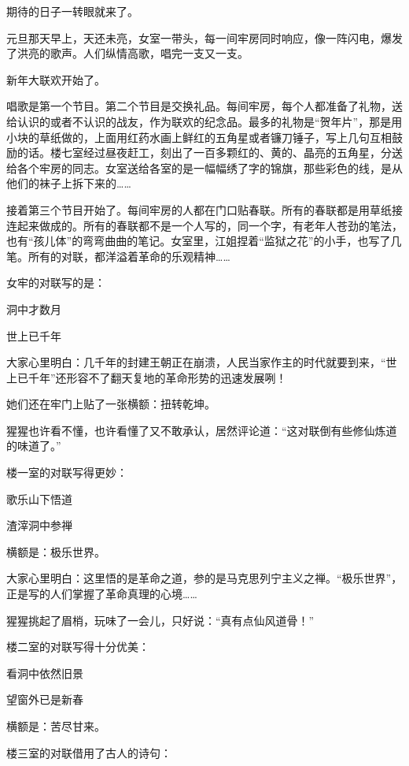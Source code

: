 \documentclass[12pt,UTF-8,openany]{ctexbook}
\begin{document}
\begin{Large}
    
    期待的日子一转眼就来了。
    
    元旦那天早上，天还未亮，女室一带头，每一间牢房同时响应，像一阵闪电，爆发了洪亮的歌声。人们纵情高歌，唱完一支又一支。
    
    新年大联欢开始了。
    
    唱歌是第一个节目。第二个节目是交换礼品。每间牢房，每个人都准备了礼物，送给认识的或者不认识的战友，作为联欢的纪念品。最多的礼物是“贺年片”，那是用小块的草纸做的，上面用红药水画上鲜红的五角星或者镰刀锤子，写上几句互相鼓励的话。楼七室经过昼夜赶工，刻出了一百多颗红的、黄的、晶亮的五角星，分送给各个牢房的同志。女室送给各室的是一幅幅绣了字的锦旗，那些彩色的线，是从他们的袜子上拆下来的……
    
    接着第三个节目开始了。每间牢房的人都在门口贴春联。所有的春联都是用草纸接连起来做成的。所有的春联都不是一个人写的，同一个字，有老年人苍劲的笔法，也有“孩儿体”的弯弯曲曲的笔记。女室里，江姐捏着“监狱之花”的小手，也写了几笔。所有的对联，都洋溢着革命的乐观精神……
    
    女牢的对联写的是：
    
    洞中才数月
    
    世上已千年
    
    大家心里明白：几千年的封建王朝正在崩溃，人民当家作主的时代就要到来，“世上已千年”还形容不了翻天复地的革命形势的迅速发展咧！
    
    她们还在牢门上贴了一张横额：扭转乾坤。
    
    猩猩也许看不懂，也许看懂了又不敢承认，居然评论道：“这对联倒有些修仙炼道的味道了。”
    
    楼一室的对联写得更妙：
    
    歌乐山下悟道
    
    渣滓洞中参禅
    
    横额是：极乐世界。
    
    大家心里明白：这里悟的是革命之道，参的是马克思列宁主义之禅。“极乐世界”，正是写的人们掌握了革命真理的心境……
    
    猩猩挑起了眉梢，玩味了一会儿，只好说：“真有点仙风道骨！”
    
    楼二室的对联写得十分优美：
    
    看洞中依然旧景
    
    望窗外已是新春
    
    横额是：苦尽甘来。
    
    楼三室的对联借用了古人的诗句：
    

\end{Large}
\end{document}

